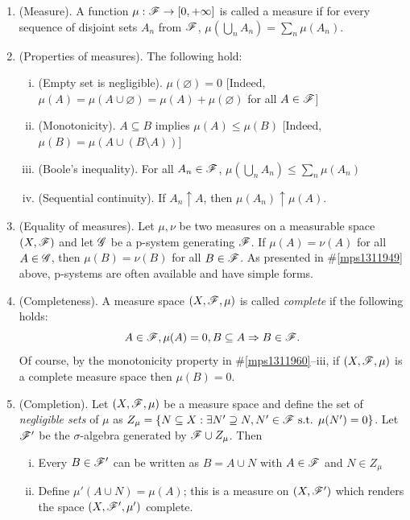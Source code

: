\documentclass[a4paper,10pt]{scrbook}
\begin{document}
\begin{enumerate}
 \item (Measure). A function $\mu: \mathscr{F}\to [0,+\infty]$ is called a measure if 
       for every sequence of disjoint sets $A_n$ from $\mathscr{F}$, $\mu(\bigcup_n A_n)= \sum_n \mu(A_n)$.

 \item \label{mps1311960}
      (Properties of measures). The following hold:
      \begin{enumerate}[i.]
       \item (Empty set is negligible). $\mu(\varnothing)=0$ [Indeed, $\mu(A) = \mu(A\cup \varnothing) = \mu(A) + \mu(\varnothing)$ for all $A\in\mathscr{F}$]
       \item (Monotonicity). $A\subseteq B$ implies $\mu(A) \leq \mu(B)$ [Indeed, $\mu(B) = \mu(A\cup (B\setminus A))$]
       \item (Boole's inequality). For all $A_n\in\mathscr{F}$, $\mu(\bigcup_n A_n) \leq \sum_n \mu(A_n)$
       \item (Sequential continuity). If $A_n\uparrow A$, then $\mu(A_n)\uparrow \mu(A)$.
      \end{enumerate}

 \item (Equality of measures). Let $\mu,\nu$ be two measures on a measurable space $(X,\mathscr{F})$ and let $\mathscr{G}$ 
       be a p-system generating $\mathscr{F}$. If $\mu(A) = \nu(A)$ for all $A\in \mathscr{G}$, then $\mu(B) = \nu(B)$
       for all $B\in\mathscr{F}$. As presented in \#\ref{mps1311949} above, p-systems are often available and 
       have simple forms.
      
 \item (Completeness). A measure space $(X,\mathscr{F},\mu)$ is called \textit{complete} if the following holds:
	\[
	    A \in \mathscr{F}, \mu(A)=0, B\subseteq A \Rightarrow B \in \mathscr{F}.
	\]
       Of course, by the monotonicity property in \#\ref{mps1311960}--iii, if $(X,\mathscr{F},\mu)$ is a complete 
       measure space then $\mu(B) = 0$.
       
 \item (Completion). Let $(X,\mathscr{F},\mu)$ be a measure space and define the set of \textit{negligible sets} of $\mu$ as 
       $Z_\mu = \{N \subseteq X: \exists N'\supseteq N, N'\in\mathscr{F} \text{ s.t. } \mu(N')=0\}$.
       Let $\mathscr{F}'$ be the $\sigma$-algebra generated by $\mathscr{F}\cup Z_\mu$. Then
       \begin{enumerate}[i.]
        \item Every $B\in\mathscr{F}'$ can be written as $B=A\cup N$ with $A\in\mathscr{F}$ and $N\in Z_\mu$
        \item Define $\mu'(A\cup N) = \mu(A)$; this is a measure on $(X,\mathscr{F}')$ which renders 
              the space $(X,\mathscr{F}',\mu')$ complete. 
       \end{enumerate}
 

\end{enumerate}
\end{document}
